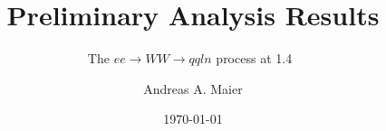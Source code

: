 \documentclass{beamer}
\title{Preliminary Analysis Results}
\subtitle{The $ee \rightarrow WW \rightarrow qqln$ process at 1.4~\TeV}
\author{Andreas A. Maier\inst{1}}
\institute[CERN] %
{
  \inst{1}%
  CERN
}
\date{\today}
\begin{document}
\begin{frame}
  \titlepage
\end{frame}





































\end{document}
